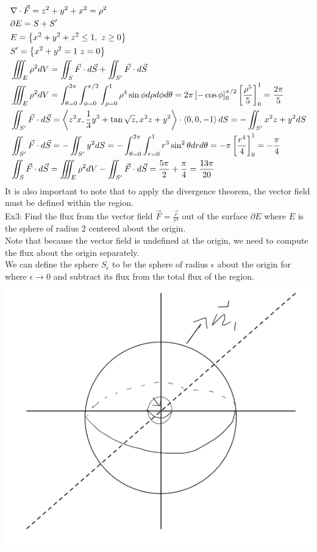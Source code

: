 \documentclass[11pt, fleqn]{article}
\begin{document}
\begin{align*}
    &\nabla\cdot \vec{F}=z^2+y^2+x^2=\rho^2\\
    &\partial E=S+S'\\
    &E=\left\{ x^2+y^2+z^2\leq1,\ z\geq0 \right\}\\
    &S'=\left\{ x^2+y^2=1\ z=0 \right\}\\
    &\iiint_E \rho^2dV=\iint_S\vec{F}\cdot d\vec{S}+\iint_{S'}\vec{F}\cdot d\vec{S}\\
    &\iiint_E\rho^2dV=\int_{\theta=0}^{2\pi}\int_{\phi=0}^{\pi/2}\int_{\rho=0}^1\rho^4\sin\phi d\rho d\phi d\theta=2\pi\left[ -\cos\phi \right]_0^{\pi/2}\left[ \frac{\rho^5}{5} \right]_0^1=\frac{2\pi}{5}\\
    &\iint_{S'}\vec{F}\cdot d\vec{S}=\left\langle z^2x,\frac{1}{3}y^3+\tan\sqrt{z},x^2z+y^2 \right\rangle\cdot\left\langle 0,0,-1 \right\rangle dS=-\iint_{S'}x^2z+y^2 dS\\
    &\iint_{S'}\vec{F}\cdot d\vec{S}=-\iint_{S'}y^2dS=-\int_{\theta=0}^{2\pi}\int_{r=0}^1r^3\sin^2\theta drd\theta=-\pi\left[ \frac{r^4}{4} \right]_0^1=-\frac{\pi}{4}\\
    &\iint_S\vec{F}\cdot d\vec{S}=\iiint_E\rho^2dV-\iint_{S'}\vec{F}\cdot d\vec{S}=\frac{5\pi}{2}+\frac{\pi}{4}=\frac{13\pi}{20}
\end{align*}
It is also important to note that to apply the divergence theorem, the vector field must be defined within the region.\\
Ex3: Find the flux from the vector field $\vec{F}=\frac{\vec{r}}{r^3}$ out of the surface $\partial E$ where $E$ is the sphere of radius 2 centered about the origin.\\
Note that because the vector field is undefined at the origin, we need to compute the flux about the origin separately.\\
We can define the sphere $S_{\epsilon}$ to be the sphere of radius $\epsilon$ about the origin for where $\epsilon\to0$ and subtract its flux from the total flux of the region.\\
\includegraphics[scale=0.5]{Math217Pictures/divergenceThmEx2.png}
\end{document}
